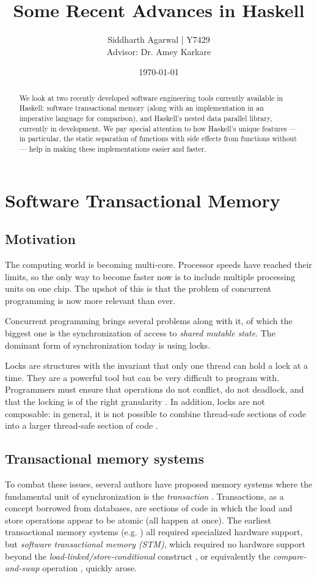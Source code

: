 \documentclass[a4paper]{acmtrans2m}
\title{Some Recent Advances in Haskell}
\author{Siddharth Agarwal | Y7429\\
  Advisor: Dr. Amey Karkare}
\date{\today}
\begin{document}
\maketitle

\tableofcontents

\begin{abstract}
We look at two recently developed software engineering tools currently available
in Haskell: software transactional memory (along with an implementation in an
imperative language for comparison), and Haskell's nested data parallel library,
currently in development. We pay special attention to how Haskell's unique
features --- in particular, the static separation of functions with side effects
from functions without --- help in making these implementations easier and
faster.
\end{abstract}

\section{Software Transactional Memory}

\subsection{Motivation}

The computing world is becoming multi-core. Processor speeds have reached their
limits, so the only way to become faster now is to include multiple processing
units on one chip. The upshot of this is that the problem of concurrent
programming is now more relevant than ever.

Concurrent programming brings several problems along with it, of which the
biggest one is the synchronization of access to \textit{shared mutable
  state}. The dominant form of synchronization today is using locks.

Locks are structures with the invariant that only one thread can hold a lock at
a time. They are a powerful tool but can be very difficult to program
with. Programmers must ensure that operations do not conflict, do not deadlock,
and that the locking is of the right granularity \cite{Duffy:2010}. In addition,
locks are not composable: in general, it is not possible to combine thread-safe
sections of code into a larger thread-safe section of code \cite{Harris:2005}.

\subsection{Transactional memory systems}
To combat these issues, several authors have proposed memory systems where the
fundamental unit of synchronization is the \textit{transaction}
\cite{Harris:2007}. Transactions, as a concept borrowed from databases, are
sections of code in which the load and store operations appear to be atomic (all
happen at once). The earliest transactional memory systems
(e.g. \cite{Herlihy:1993}) all required specialized hardware support, but
\textit{software transactional memory (STM)}, which required no hardware support
beyond the \textit{load-linked/store-conditional} construct \cite{Shavit:1995}, or
equivalently the \textit{compare-and-swap} operation \cite{Harris:2003}, quickly
arose.
\end{document}
